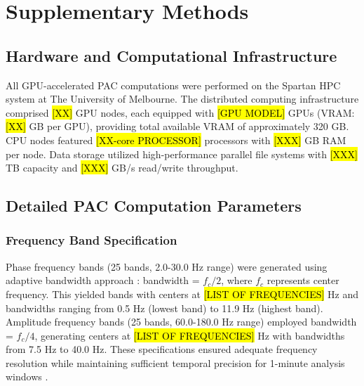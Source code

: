 

\section{Supplementary Methods}

\subsection{Hardware and Computational Infrastructure}
All GPU-accelerated PAC computations were performed on the Spartan HPC system at The University of Melbourne. The distributed computing infrastructure comprised \hl{[XX]} GPU nodes, each equipped with \hl{[GPU MODEL]} GPUs (VRAM: \hl{[XX]} GB per GPU), providing total available VRAM of approximately 320 GB. CPU nodes featured \hl{[XX-core PROCESSOR]} processors with \hl{[XXX]} GB RAM per node. Data storage utilized high-performance parallel file systems with \hl{[XXX]} TB capacity and \hl{[XXX]} GB/s read/write throughput.

\subsection{Detailed PAC Computation Parameters}
\subsubsection{Frequency Band Specification}
Phase frequency bands (25 bands, 2.0-30.0 Hz range) were generated using adaptive bandwidth approach \cite{Tort2010MeasuringPCE}: bandwidth = $f_c/2$, where $f_c$ represents center frequency. This yielded bands with centers at \hl{[LIST OF FREQUENCIES]} Hz and bandwidths ranging from 0.5 Hz (lowest band) to 11.9 Hz (highest band). Amplitude frequency bands (25 bands, 60.0-180.0 Hz range) employed bandwidth = $f_c/4$, generating centers at \hl{[LIST OF FREQUENCIES]} Hz with bandwidths from 7.5 Hz to 40.0 Hz. These specifications ensured adequate frequency resolution while maintaining sufficient temporal precision for 1-minute analysis windows \cite{Hlsemann2019QuantificationOPA,Munia2019TimeFrequencyBPK}.

